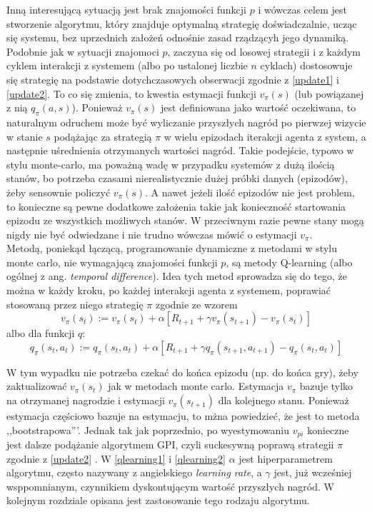 \documentclass[licencjacka]{pracamgr}
\begin{document}
Inną interesującą sytuacją jest brak znajomości funkcji $p$ i wówczas celem jest stworzenie algorytmu, który znajduje optymalną strategię doświadczalnie, ucząc się systemu, bez uprzednich założeń odnośnie zasad rządzącyh  jego dynamiką.  Podobnie jak  w sytuacji znajomoci $p$,  zaczyna się od losowej strategii i z każdym cyklem interakcji z systemem (albo po ustalonej liczbie  $n$ cyklach) dostosowuje się strategię na podstawie dotychczasowych obserwacji zgodnie z \ref{update1} i \ref{update2}. To co się zmienia, to kwestia estymacji funkcji $v_{\pi}(s)$ (lub powiązanej z nią $q_{\pi}(a,s)$). Ponieważ $v_{\pi}(s)$ jest definiowana jako wartość oczekiwana, to naturalnym odruchem może być wyliczanie przyszłych nagród po pierwzej wizycie w stanie $s$ podążając za strategią $\pi$ w wielu epizodach iterakcji agenta z system, a następnie uśrednienia otrzymanych wartości nagród. Takie podejście, typowo w stylu monte-carlo, ma poważną wadę w przypadku systemów z dużą ilością stanów, bo potrzeba czasami nierealistycznie dużej próbki danych (epizodów), żeby sensownie policzyć  $v_{\pi}(s)$. A nawet jeżeli ilość epizodów nie jest problem, to konieczne są pewne dodatkowe założenia takie jak konieczność startowania epizodu ze wszystkich możliwych stanów. W przeciwnym razie pewne stany mogą nigdy nie być odwiedzane i nie trudno wówczas mówić o estymacji $v_{\pi}$.  \\
 
 Metodą, poniekąd łączącą, programowanie dynamiczne z metodami w stylu monte carlo, nie wymagającą znajomości funkcji $p$, są metody Q-learning (albo ogólnej z ang. \textit{temporal difference}).  Idea tych metod sprowadza się do tego, że można w każdy kroku, po każdej interakcji agenta z systemem, poprawiać stosowaną przez niego strategię $\pi$ zgodnie ze wzorem
\begin{equation}\label{qlearning1}
   v_{\pi}(s_{t}) := v_{\pi}(s_{t}) +\alpha [R_{t+1} + \gamma v_{\pi}(s_{t+1}) - v_{\pi}(s_{t})]
 \end{equation}
 albo dla funkcji $q$:
\begin{equation}\label{qlearning2}
   q_{\pi}(s_{t}, a_{t}) := q_{\pi}(s_{t},a_{t}) +\alpha [R_{t+1} + \gamma q_{\pi}(s_{t+1}, a_{t+1}) - q_{\pi}(s_{t},a_{t})]
 \end{equation}
 
 W tym wypadku nie potrzeba czekać do końca epizodu (np. do końca gry), żeby zaktualizować $v_{\pi}(s_{t})$ jak w metodach monte carlo. Estymacja $v_{\pi}$  bazuje tylko na otrzymanej nagrodzie i estymacji $v_{\pi}(s_{t+1})$ dla kolejnego stanu. Ponieważ estymacja częściowo bazuje na estymacju, to mżna powiedzieć, że jest to metoda ,,bootstrapowa'''. Jednak tak jak poprzednio, po wyestymowaniu $v_{pi}$ konieczne jest dalsze podążanie algorytmem GPI, czyli suckesywną poprawą strategii $\pi$ zgodnie z \ref{update2} .   W \ref{qlearning1} i \ref{qlearning2}  $\alpha$ jest hiperparametrem algorytmu, często nazywany z angielskiego \textit{learning rate}, a $\gamma$ jest, już wcześniej wsppomnianym, czynnikiem dyskontującym wartość przyszłych nagród. W kolejnym rozdziale opisana jest zastosowanie tego rodzaju algorytmu. \\
 
\end{document}
